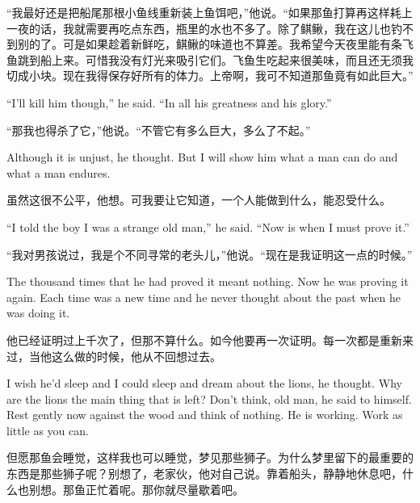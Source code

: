 \begin{paracol}{2}
\switchcolumn

“我最好还是把船尾那根小鱼线重新装上鱼饵吧，”他说。“如果那鱼打算再这样耗上一夜的话，我就需要再吃点东西，瓶里的水也不多了。除了鲯鳅，我在这儿也钓不到别的了。可是如果趁着新鲜吃，鲯鳅的味道也不算差。我希望今天夜里能有条飞鱼跳到船上来。可惜我没有灯光来吸引它们。飞鱼生吃起来很美味，而且还无须我切成小块。现在我得保存好所有的体力。上帝啊，我可不知道那鱼竟有如此巨大。”

\switchcolumn*

``I'll kill him though,'' he said. ``In all his \gls{greatness} and his \gls{glory}.''

\switchcolumn

“那我也得杀了它，”他说。“不管它有多么巨大，多么了不起。”

\switchcolumn*

Although it is \gls{unjust}, he thought. But I will show him what a man can
do and what a man endures.

\switchcolumn

虽然这很不公平，他想。可我要让它知道，一个人能做到什么，能忍受什么。

\switchcolumn*

``I told the boy I was a strange old man,'' he said. ``Now is when I must
prove it.''

\switchcolumn

“我对男孩说过，我是个不同寻常的老头儿，”他说。“现在是我证明这一点的时候。”

\switchcolumn*

The thousand times that he had proved it meant nothing. Now he was proving
it again. Each time was a new time and he never thought about the past when
he was doing it.

\switchcolumn

他已经证明过上千次了，但那不算什么。如今他要再一次证明。每一次都是重新来过，当他这么做的时候，他从不回想过去。

\switchcolumn*

I wish he'd sleep and I could sleep and dream about the lions, he thought.
Why are the lions the main thing that is left? Don't think, old man, he said
to himself. Rest gently now against the wood and think of nothing. He is
working. Work as little as you can.

\switchcolumn

但愿那鱼会睡觉，这样我也可以睡觉，梦见那些狮子。为什么梦里留下的最重要的东西是那些狮子呢？别想了，老家伙，他对自己说。靠着船头，静静地休息吧，什么也别想。那鱼正忙着呢。那你就尽量歇着吧。


\end{paracol}
